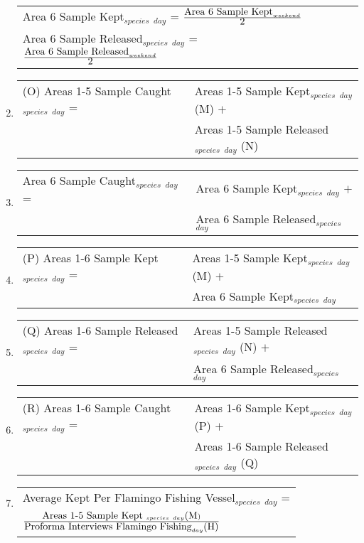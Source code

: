 \documentclass[letterpaper,12pt]{article}
\newcommand{\hspacer}{\hspace*{1cm}}
\newcommand{\fraction}[1]{\textrm{\normalsize{#1}}}
\begin{document}
\begin{enumerate}
\begin{tabular}{l@{ }l@{ }l}
	Area 6 Sample Kept$_{species}$ $_{day}$ =
		$
\frac
	{\fraction{Area 6 Sample Kept}_{weekend}}
      	{\fraction{2}}
		$ \\

	Area 6 Sample Released$_{species}$ $_{day}$ =
		$
\frac
	{\fraction{Area 6 Sample Released}_{weekend}}
      	{\fraction{2}}
		$
\end{tabular}

\item
\begin{tabular}{l@{ }l@{ }}
	(O) Areas 1-5 Sample Caught$_{species}$ $_{day}$ =
		& Areas 1-5 Sample Kept$_{species}$ $_{day}$ (M) $+$ \\
		& Areas 1-5 Sample Released$_{species}$ $_{day}$ (N)
\end{tabular}

\item
\begin{tabular}{l@{ }l@{ }}
	Area 6 Sample Caught$_{species}$ $_{day}$ =
		& Area 6 Sample Kept$_{species}$ $_{day}$ $+$ \\
		& Area 6 Sample Released$_{species}$ $_{day}$
\end{tabular}

\item
\begin{tabular}{l@{ }l@{ }}
	(P) Areas 1-6 Sample Kept$_{species}$ $_{day}$ =
		& Areas 1-5 Sample Kept$_{species}$ $_{day}$ (M) $+$ \\
		& Area 6 Sample Kept$_{species}$ $_{day}$
\end{tabular}

\item
\begin{tabular}{l@{ }l@{ }}
	(Q) Areas 1-6 Sample Released$_{species}$ $_{day}$ =
		& Areas 1-5 Sample Released$_{species}$ $_{day}$ (N) $+$ \\
		& Area 6 Sample Released$_{species}$ $_{day}$
\end{tabular}

\item
\begin{tabular}{l@{ }l@{ }}
	(R) Areas 1-6 Sample Caught$_{species}$ $_{day}$ =
		& Areas 1-6 Sample Kept$_{species}$ $_{day}$ (P) $+$ \\
		& Areas 1-6 Sample Released$_{species}$ $_{day}$ (Q)
\end{tabular}

\item
\begin{tabular}{l@{ }}
	Average Kept Per Flamingo Fishing Vessel$_{species}$ $_{day}$ = \\
	\hspacer
	$
	\frac
	{\fraction{Areas 1-5 Sample Kept}\ _{species}\ _{day} \fraction{(M})}
	{\fraction{Proforma Interviews Flamingo Fishing} _{day}
		\fraction{(H)}}
	$
\end{tabular}


\end{enumerate}
\end{document}
